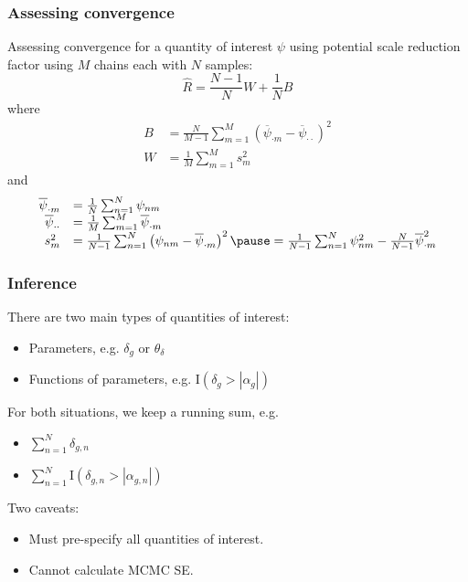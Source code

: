 \documentclass[handout]{beamer}\usepackage[]{graphicx}\usepackage[]{color}
\begin{document}
\begin{frame}
\frametitle{Assessing convergence}
Assessing convergence for a quantity of interest $\psi$ using potential scale reduction factor using $M$ chains each with $N$ samples: \pause
\[ 
\hat{R} = 
\frac{N-1}{N}W + \frac{1}{N}B
\]
\pause
where
\[ \begin{array}{rl}
B &= \frac{N}{M-1}\sum_{m=1}^M \left(\overline{\psi}_{\cdot m} - \overline{\psi}_{\cdot \cdot}\right)^2 \\
W &= \frac{1}{M}\sum_{m=1}^M s_m^2
\end{array} \]
\pause
and 
\[ \begin{array}{rl}
\overline{\psi}_{\cdot m} & = \frac{1}{N} \sum_{n=1}^N \psi_{nm} \\
\overline{\psi}_{\cdot \cdot} &= \frac{1}{M} \sum_{m=1}^M \overline{\psi}_{\cdot m} \\
s_m^2 &= \frac{1}{N-1} \sum_{n=1}^N \left(\psi_{nm} -\overline{\psi}_{\cdot m} \right)^2 \pause = \frac{1}{N-1} \sum_{n=1}^N \psi_{nm}^2 - \frac{N}{N-1} \overline{\psi}_{\cdot m}^2
\end{array} \]
\end{frame}


\begin{frame}
\frametitle{Inference}

There are two main types of quantities of interest:
\begin{itemize}
\item Parameters, e.g. $\delta_g$ or $\theta_\delta$
\item Functions of parameters, e.g. $\mathrm{I}(\delta_g > |\alpha_g|)$
\end{itemize}
\pause
For both situations, we keep a running sum, e.g. 
\begin{itemize}
\item $\sum_{n=1}^N \delta_{g,n}$ 
\item $\sum_{n=1}^N \mathrm{I}(\delta_{g,n} > |\alpha_{g,n}|)$
\end{itemize}
\pause
Two caveats:
\begin{itemize}
\item Must pre-specify all quantities of interest.
\item Cannot calculate MCMC SE.
\end{itemize}
\end{frame}
\end{document}
